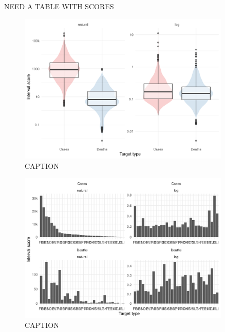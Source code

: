 \documentclass{article}
\begin{document}
NEED A TABLE WITH SCORES

\begin{figure}[h!]
    \centering
    \includegraphics[width=0.9\textwidth]{output/figures/HUB-average-scores.png}
    \caption{CAPTION}
    \label{fig:HUB-average-scores}
\end{figure}

\begin{figure}[h!]
    \centering
    \includegraphics[width=0.9\textwidth]{output/figures/HUB-scores-locations.png}
    \caption{CAPTION}
    \label{fig:HUB-scores-location}
\end{figure}
\end{document}
